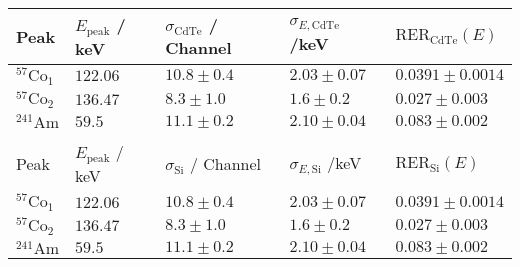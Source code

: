 	\begin{tabular}{|p{2cm}|p{2.5cm}|p{3cm}|p{3cm}|p{3cm}|}
		\hline
		\rowcolor{tabcolor}
		Peak   & $E_\mathrm{peak}$ / keV & $\sigma_\mathrm{CdTe}$ / Channel &             $\sigma_{E, \mathrm{CdTe}}$ /keV & $\mathrm{RER_{CdTe}}(E)$ \\ 
		\hline
		$^{57}\mathrm{Co}_1$ & $122.06$ & $10.8 \pm 0.4$ & $2.03 \pm 0.07$ & $0.0391 \pm 0.0014$\\ 
		$^{57}\mathrm{Co}_2$ & $136.47$ & $8.3 \pm 1.0$ & $1.6 \pm 0.2$ & $0.027 \pm 0.003$\\ 
		$^{241}\mathrm{Am}$ & $59.5$ & $11.1 \pm 0.2$ & $2.10 \pm 0.04$ & $0.083 \pm 0.002$\\ 
		\hline &&&&\\ 
		\hline
		\rowcolor{tabcolor}
		Peak   & $E_\mathrm{peak}$ / keV & $\sigma_\mathrm{Si}$ / Channel &             $\sigma_{E, \mathrm{Si}}$ /keV & $\mathrm{RER_{Si}}(E)$ \\ 
		\hline
		$^{57}\mathrm{Co}_1$ & $122.06$ & $10.8 \pm 0.4$ & $2.03 \pm 0.07$ & $0.0391 \pm 0.0014$\\ 
		$^{57}\mathrm{Co}_2$ & $136.47$ & $8.3 \pm 1.0$ & $1.6 \pm 0.2$ & $0.027 \pm 0.003$\\ 
		$^{241}\mathrm{Am}$ & $59.5$ & $11.1 \pm 0.2$ & $2.10 \pm 0.04$ & $0.083 \pm 0.002$\\ 
		\hline
	\end{tabular}
